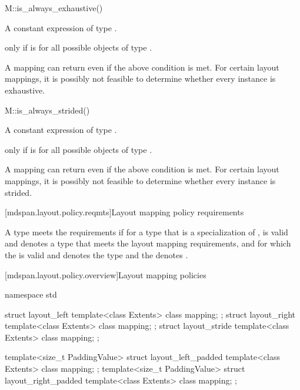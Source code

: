 \begin{itemdecl}
M::is_always_exhaustive()
\end{itemdecl}

\begin{itemdescr}
\pnum
\result
A constant expression of type .

\pnum
\returns
{} only if  is 
for all possible objects  of type .
\begin{note}
A mapping can return  even if the above condition is met.
For certain layout mappings, it is possibly not feasible to determine
whether every instance is exhaustive.
\end{note}
\end{itemdescr}

\begin{itemdecl}
M::is_always_strided()
\end{itemdecl}

\begin{itemdescr}
\pnum
\result
A constant expression of type .

\pnum
\returns
{} only if  is 
for all possible objects  of type .
\begin{note}
A mapping can return  even if the above condition is met.
For certain layout mappings, it is possibly not feasible to determine
whether every instance is strided.
\end{note}
\end{itemdescr}

[mdspan.layout.policy.reqmts]{Layout mapping policy requirements}

\pnum
A type  meets the  requirements
if for a type  that is a specialization of ,
 is valid and denotes a type 
that meets the layout mapping requirements, and
for which the   is valid and
denotes the type  and
the   denotes .

[mdspan.layout.policy.overview]{Layout mapping policies}

\begin{codeblock}
namespace std {
  struct layout_left {
    template<class Extents>
      class mapping;
  };
  struct layout_right {
    template<class Extents>
      class mapping;
  };
  struct layout_stride {
    template<class Extents>
      class mapping;
  };

  template<size_t PaddingValue>
  struct layout_left_padded {
    template<class Extents> class mapping;
  };
  template<size_t PaddingValue>
  struct layout_right_padded {
    template<class Extents> class mapping;
  };
}
\end{codeblock}

